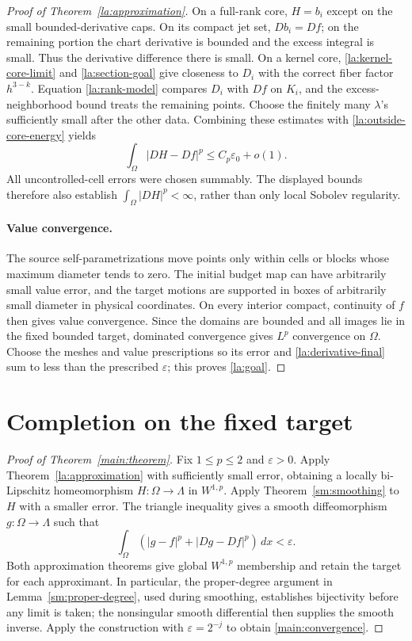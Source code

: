 \documentclass[11pt]{article}
\numberwithin{equation}{section}
\theoremstyle{definition}
\theoremstyle{remark}
\newcommand{\eps}{\varepsilon}
\begin{document}
\begin{proof}[Proof of Theorem~\ref{la:approximation}]
On a full-rank core, $H=b_i$ except on the small bounded-derivative
caps.  On its compact jet set, $Db_i=Df$; on the remaining portion the
chart derivative is bounded and the excess integral is small.
Thus the derivative difference there is small.  On a kernel core,
\eqref{la:kernel-core-limit} and \eqref{la:section-goal} give closeness
to $D_i$ with the correct fiber factor $h^{3-k}$.  Equation
\eqref{la:rank-model} compares $D_i$ with $Df$ on $K_i$, and the
excess-neighborhood bound treats the remaining points.  Choose the
finitely many $\lambda$'s sufficiently small after the other data.
Combining these estimates with \eqref{la:outside-core-energy} yields
\begin{equation}\label{la:derivative-final}
 \int_\Omega|DH-Df|^p\le C_p\varepsilon_0+o(1).
\end{equation}
All uncontrolled-cell errors were chosen summably.  The displayed
bounds therefore also establish $\int_\Omega|DH|^p<\infty$, rather
than only local Sobolev regularity.

\paragraph{Value convergence.}
The source self-parametrizations move points only within cells or
blocks whose maximum diameter tends to zero.  The initial budget map
can have arbitrarily small value error, and the target motions are
supported in boxes of arbitrarily small diameter in physical
coordinates.  On every interior compact, continuity of $f$ then
gives value convergence.  Since the domains are bounded and all
images lie in the fixed bounded target, dominated convergence gives
$L^p$ convergence on $\Omega$.  Choose the meshes and value
prescriptions so its error and \eqref{la:derivative-final} sum to less
than the prescribed $\eps$; this proves \eqref{la:goal}.

\end{proof}

\section{Completion on the fixed target}\label{sec:completion}

\begin{proof}[Proof of Theorem~\ref{main:theorem}]
Fix $1\le p\le2$ and $\varepsilon>0$. Apply Theorem~\ref{la:approximation} with sufficiently small error, obtaining a locally bi-Lipschitz homeomorphism $H:\Omega\to\Lambda$ in $W^{1,p}$. Apply Theorem~\ref{sm:smoothing} to $H$ with a smaller error. The triangle inequality gives a smooth diffeomorphism $g:\Omega\to\Lambda$ such that
\[
 \int_\Omega (|g-f|^p+|Dg-Df|^p)\,dx<\varepsilon.
\]
Both approximation theorems give global $W^{1,p}$ membership and retain
the target for each approximant. In particular, the proper-degree
argument in Lemma~\ref{sm:proper-degree}, used during smoothing,
establishes bijectivity before any limit is taken; the nonsingular
smooth differential then supplies the smooth inverse. Apply the
construction with $\varepsilon=2^{-j}$ to obtain
\eqref{main:convergence}.
\end{proof}

\begingroup
\raggedright


\endgroup
\end{document}
